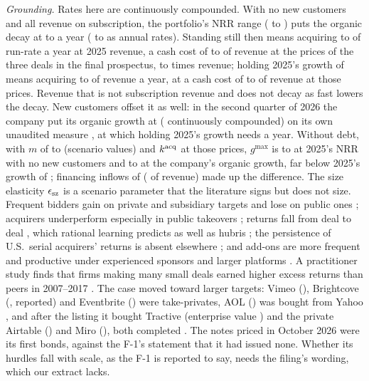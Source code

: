 \noindent\emph{Grounding.} Rates here are continuously compounded. With no new customers and all revenue on subscription, the portfolio's NRR range (\acqNrrLo{} to \acqNrrHi) puts the organic decay at \acqStandHi{} to \acqStandLo{} a year (\acqDeclLo{} to \acqDeclHi{} as annual rates). Standing still then means acquiring \acqStandUsdHi{} to \acqStandUsdLo{} of run-rate a year at 2025 revenue, a cash cost of \acqStandCashLo{} to \acqStandCashHi{} of revenue at the prices of the three deals in the final prospectus, \acqKLo{} to \acqKHi{} times revenue; holding 2025's growth of \acqLogGrowthTwentyFive{} means acquiring \acqReqLo{} to \acqReqHi{} of revenue a year, at a cash cost of \acqReqCashLo{} to \acqReqCashHi{} of revenue at those prices. Revenue that is not subscription revenue and does not decay as fast lowers the decay. New customers offset it as well: in the second quarter of 2026 the company put its organic growth at \acqQTwoOrg{} (\acqOrgLogQTwo{} continuously compounded) on its own unaudited measure \citep{bendingspoons2026sixk}, at which holding 2025's growth needs \acqReqOrg{} a year. Without debt, with $m$ of \acqMgridLo{} to \acqMgridHi{} (scenario values) and $k^{\rm acq}$ at those prices, $g^{\max}$ is \acqGmaxLo{} to \acqGmaxHi{} at 2025's NRR with no new customers and \acqGmaxOrgLo{} to \acqGmaxOrgHi{} at the company's organic growth, far below 2025's growth of \acqLogGrowthTwentyFive; financing inflows of \acqCffTwentyFive{} (\acqCffShare{} of revenue) made up the difference. The size elasticity $\epsilon_{\rm sz}$ is a scenario parameter that the literature signs but does not size. Frequent bidders gain on private and subsidiary targets and lose on public ones \citep{fuller2002what}; acquirers underperform especially in public takeovers \citep{renneboog2019failure}; returns fall from deal to deal \citep{billett2008overconfident}, which rational learning predicts as well as hubris \citep{aktas2009learning}; the persistence of U.S.\ serial acquirers' returns is absent elsewhere \citep{karolyi2025serial}; and add-ons are more frequent and productive under experienced sponsors and larger platforms \citep{hammer2017inorganic}. A practitioner study finds that firms making many small deals earned higher excess returns than peers in 2007--2017 \citep{mckinsey2019lots}. The case moved toward larger targets: Vimeo (\acqPxVim), Brightcove (\acqBcPrice, reported) and Eventbrite (\acqPxEb) were take-privates, AOL (\acqPxAol) was bought from Yahoo \citep{bendingspoons2026prospectus,ffxnow2026aol}, and after the listing it bought Tractive (enterprise value \acqTractive) and the private Airtable (\acqAirEv) and Miro (\acqMiroEv), both completed \citep{bendingspoons2026sixk}. The notes priced in October 2026 were its first bonds, against the F-1's statement that it had issued none. Whether its hurdles fall with scale, as the F-1 is reported to say, needs the filing's wording, which our extract lacks.

